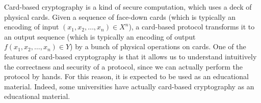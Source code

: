 Card-based cryptography \cite{Boer89, Kilian93} is a kind of secure computation, which uses a deck of physical cards. 
Given a sequence of face-down cards (which is typically an encoding of input $(x_1, x_2, \ldots, x_n) \in X^n$), a card-based protocol transforms it to an output sequence (which is typically an encoding of output $f(x_1, x_2, \ldots, x_n) \in Y$) by a bunch of physical operations on cards. 
One of the features of card-based cryptography is that it allows us to understand intuitively the correctness and security of a protocol, since we can actually perform the protocol by hands. 
For this reason, it is expected to be used as an educational material. 
Indeed, some universities \cite{CHL13, Marcedone15, MizukiTeaching16} have actually  card-based cryptography as an educational material. 

